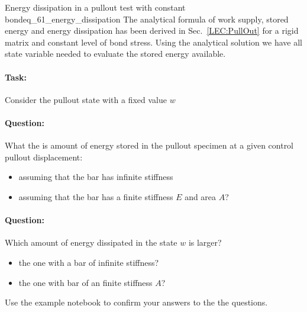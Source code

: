 \documentclass[main.tex]{subfiles}
\begin{document}
\begin{bmcsex}{Energy dissipation in a pullout test with constant bond}{eq_61_energy_dissipation}
The analytical formula of work supply, stored energy and energy dissipation
has been derived in Sec.~\ref{LEC:PullOut} for a rigid matrix and constant level of bond stress.
Using the analytical solution we have all state variable needed to evaluate the stored energy available. 

\paragraph{Task:} Consider the pullout state with a fixed value $w$

\paragraph{Question:} What the is amount of energy stored in the pullout specimen at a given control pullout displacement:
\begin{itemize}
    \item assuming that the bar has infinite stiffness
    \item assuming that the bar has a finite  stiffness $E$ and area $A$?
\end{itemize}

\paragraph{Question:} Which amount of energy dissipated in the state $w$ is larger?  
\begin{itemize}
    \item the one with a bar of infinite stiffness? 
    \item the one with bar of an finite stiffness $A$?
\end{itemize}
Use the example notebook to confirm your answers to the the questions.
\end{bmcsex}
\end{document}
